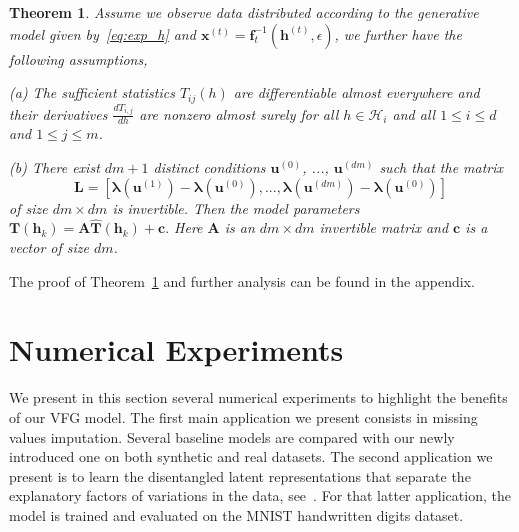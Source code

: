 \documentclass{article} %
\newtheorem{theorem}{Theorem}
\begin{document}
\begin{theorem}\label{thm:identif}
Assume we observe data distributed according to the generative model given by~\eqref{eq:exp_h} and $\mathbf{x}^{(t)} = \mathbf{f}^{-1}_t(\mathbf{h}^{(t)}, \epsilon)$, we further have the following assumptions,

\vspace{0.05in}

(a) The sufficient statistics $T_{ij}(h)$ are differentiable almost everywhere and their derivatives $\frac{d T_{i,j}}{d h}$ are nonzero almost surely for all $h\in \mathcal{H}_i$ and all $1\leq i \leq d$ and $1 \leq j  \leq m$.

\vspace{0.05in}


(b) There exist $dm+1$ distinct conditions $\mathbf{u}^{(0)}$, ..., $\mathbf{u}^{(dm)}$  such that the matrix 
\begin{equation*} 
\mathbf{L} = [\mathbf{\lambda}(\mathbf{u}^{(1)}) - \mathbf{\lambda}(\mathbf{u}^{(0)}), ..., \mathbf{\lambda}(\mathbf{u}^{(dm)}) - \mathbf{\lambda}(\mathbf{u}^{(0)}) ]
\end{equation*} 
of size $dm \times dm$ is invertible.
Then the model parameters 
$\mathbf{T}(\mathbf{h}_k) = \mathbf{A}\widehat{\mathbf{T}}(\mathbf{h}_k) + \mathbf{c}.$ Here $\mathbf{A}$ is an $dm \times dm$ invertible matrix and $\mathbf{c}$ is a vector of size $dm$.
\end{theorem}

The proof of Theorem~\ref{thm:identif} and further analysis can be found in the appendix. 

\vspace{-0.05in}
\section{Numerical Experiments}\label{sec:numerical}
\vspace{-0.05in}

We present in this section several numerical experiments to highlight the benefits of our VFG model.
The first main application we present consists in missing values imputation. Several baseline models are compared with our newly introduced one on both synthetic and real datasets.
The second application we present is to learn the disentangled latent representations   that separate the explanatory factors of variations in the data, see~\citet{bengio2013representation}.
For that latter application, the model is trained and evaluated on the MNIST handwritten digits dataset.
\end{document}
